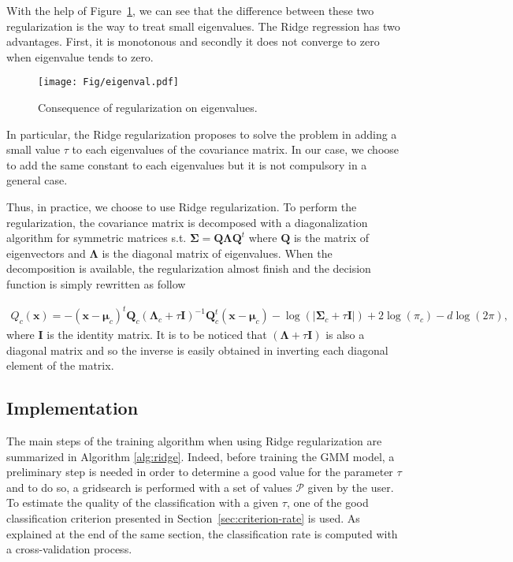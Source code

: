 \documentclass[a4paper,11pt,DIV=16,abstracton]{scrartcl}
\begin{document}
    With the help of Figure~\ref{fig:eigenvalues}, we can see that the difference between these two regularization is the way to treat small eigenvalues. The Ridge regression has two advantages. First, it is monotonous and secondly it does not converge to zero when eigenvalue tends to zero.

    \begin{figure}[!ht]
        \centering
        \texttt{[image: Fig/eigenval.pdf]}
        \caption{Consequence of regularization on eigenvalues.\label{fig:eigenvalues}}
    \end{figure}

    In particular, the Ridge regularization proposes to solve the problem in adding a small value $\tau$ to each eigenvalues of the covariance matrix. In our case, we choose to add the same constant to each eigenvalues but it is not compulsory in a general case.

    Thus, in practice, we choose to use Ridge regularization. To perform the regularization, the covariance matrix is decomposed with a diagonalization algorithm for symmetric matrices s.t. $\boldsymbol{\Sigma} = \mathbf{Q} \boldsymbol{\Lambda} \mathbf{Q}^t$ where $\mathbf{Q}$ is the matrix of eigenvectors and $\boldsymbol{\Lambda}$ is the diagonal matrix of eigenvalues. When the decomposition is available, the regularization almost finish and the decision function is simply rewritten as follow

    \begin{align}
    \label{eq:decision-ridge}
        Q_c(\mathbf{x}) = - (\mathbf{x} - \boldsymbol{\mu}_c)^t \mathbf{Q}_c (\boldsymbol{\Lambda}_c + \tau \mathbf{I})^{-1} \mathbf{Q}_c^t (\mathbf{x} - \boldsymbol{\mu}_c) - \log (|\boldsymbol{\Sigma}_c + \tau \mathbf{I}|) + 2 \log (\pi_c) - d \log (2\pi),
    \end{align}
    where $\mathbf{I}$ is the identity matrix. It is to be noticed that $(\boldsymbol{\Lambda} + \tau \mathbf{I})$ is also a diagonal matrix and so the inverse is easily obtained in inverting each diagonal element of the matrix.

    \subsection{Implementation}

    The main steps of the training algorithm when using Ridge regularization are summarized in Algorithm \ref{alg:ridge}. Indeed, before training the GMM model, a preliminary step is needed in order to determine a good value for the parameter $\tau$ and to do so, a gridsearch is performed with a set of values $\mathcal{P}$ given by the user. To estimate the quality of the classification with a given $\tau$, one of the good classification criterion presented in Section~\ref{sec:criterion-rate} is used. As explained at the end of the same section, the classification rate is computed with a cross-validation process.
\end{document}
